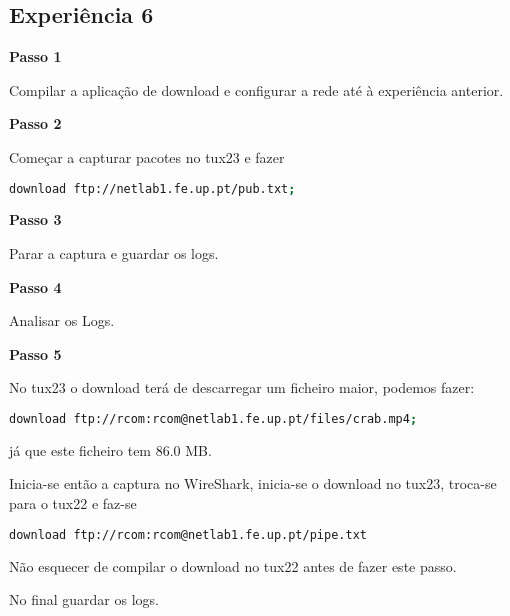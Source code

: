 \subsection{Experiência 6} \label{exp6_steps}

\textbf{Passo 1}

Compilar a aplicação de download e configurar a rede até à experiência anterior.

\textbf{Passo 2}

Começar a capturar pacotes no tux23 e fazer 
\begin{lstlisting}[language=bash]
download ftp://netlab1.fe.up.pt/pub.txt;
\end{lstlisting}


\textbf{Passo 3}

Parar a captura e guardar os logs.

\textbf{Passo 4}

Analisar os Logs.

\textbf{Passo 5}

No tux23 o download terá de descarregar um ficheiro maior, podemos fazer:
\begin{lstlisting}[language=bash]
download ftp://rcom:rcom@netlab1.fe.up.pt/files/crab.mp4;
\end{lstlisting}
já que este ficheiro tem 86.0 MB. 

Inicia-se então a captura no WireShark, inicia-se o download no tux23, troca-se para o tux22 e faz-se
\begin{lstlisting}[language=bash]
download ftp://rcom:rcom@netlab1.fe.up.pt/pipe.txt
\end{lstlisting}

Não esquecer de compilar o download no tux22 antes de fazer este passo.

No final guardar os logs.